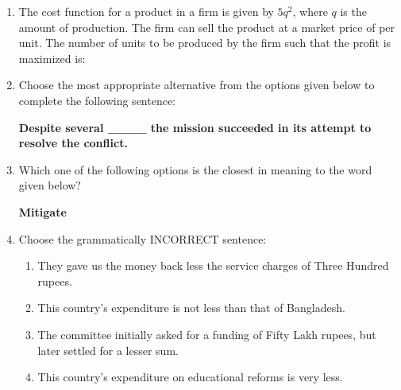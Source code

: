 \documentclass[journal]{IEEEtran}
\numberwithin{equation}{enumi}
\numberwithin{figure}{enumi}
\begin{document}
\begin{enumerate}
\item The cost function for a product in a firm is given by $5q^2$, where $q$ is the amount of production. The firm can sell the product at a market price of  per unit. The number of units to be produced by the firm such that the profit is maximized is:
\begin{enumerate}
\end{enumerate}

\item Choose the most appropriate alternative from the options given below to complete the following sentence:  

\textbf{Despite several \_\_\_\_ the mission succeeded in its attempt to resolve the conflict.}
\begin{enumerate}
\end{enumerate}

\item Which one of the following options is the closest in meaning to the word given below?  

\textbf{Mitigate}  
\begin{enumerate}
\end{enumerate}

\item Choose the grammatically INCORRECT sentence:

\begin{enumerate}
\item They gave us the money back less the service charges of Three Hundred rupees.  
\item This country's expenditure is not less than that of Bangladesh.  
\item The committee initially asked for a funding of Fifty Lakh rupees, but later settled for a lesser sum.  
\item This country's expenditure on educational reforms is very less.  
\end{enumerate}


\end{enumerate}
\end{document}
